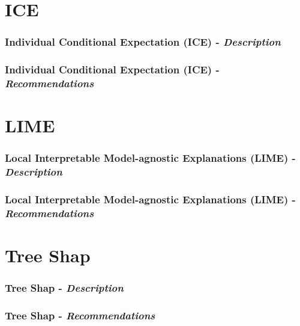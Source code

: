 \documentclass[11pt, 
               aspectratio=169]{beamer}
\begin{document}
	\section{ICE}

	\begin{frame}
		\frametitle{Individual Conditional Expectation (ICE) - \textit{Description}}
	\end{frame}

	\begin{frame}
		\frametitle{Individual Conditional Expectation (ICE) - \textit{Recommendations}}
	\end{frame}

	\section{LIME}

	\begin{frame}
		\frametitle{Local Interpretable Model-agnostic Explanations (LIME) - \textit{Description}}
	\end{frame}

	\begin{frame}
		\frametitle{Local Interpretable Model-agnostic Explanations (LIME) - \textit{Recommendations}}
	\end{frame}


	\section{Tree Shap}

	\begin{frame}
		\frametitle{Tree Shap - \textit{Description}}
	\end{frame}

	\begin{frame}
		\frametitle{Tree Shap - \textit{Recommendations}}
	\end{frame}
\end{document}

